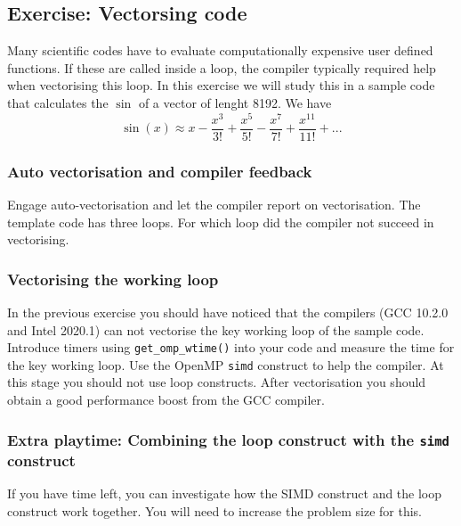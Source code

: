 \subsection{Exercise: Vectorsing code}
Many scientific codes have to evaluate computationally expensive user defined functions.  If these are called inside a loop, the compiler typically required help when vectorising this loop.  In this exercise we will study this in a sample code that calculates the $\sin$ of a vector of lenght 8192.  We have
\begin{equation}
\sin(x) \approx x - \frac{x^3}{3!}  + \frac{x^5}{5!} - \frac{x^7}{7!} + \frac{x^{11}}{11!} + ...
\end{equation}
\subsubsection{Auto vectorisation and compiler feedback}
Engage auto-vectorisation and let the compiler report on vectorisation.  The template code has three loops.  For which loop did the compiler not succeed in vectorising.
\subsubsection{Vectorising the working loop}
In the previous exercise you should have noticed that the compilers (GCC 10.2.0 and Intel 2020.1) can not vectorise the key working loop of the sample code.  
Introduce timers using \verb+get_omp_wtime()+ into your code and measure the time for the key working loop.  Use the OpenMP \verb+simd+ construct to help the compiler.  At this stage you should not use loop constructs.
After vectorisation you should obtain a good performance  boost from the GCC compiler.

\subsubsection{Extra playtime: Combining the loop construct with the {\tt simd} construct}
If you have time left, you can investigate how the SIMD construct and the loop construct work together.   You will need to increase the problem size for this.
